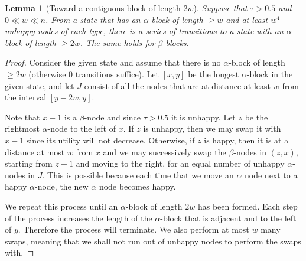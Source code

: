\documentclass[11pt]{article}
\theoremstyle{plain}
\newtheorem{lem}[thm]{Lemma}
\numberwithin{equation}{subsection}
\begin{document}
\begin{lem}[Toward a contiguous block of length $2w$]\label{le:tomonbo2w}
Suppose that $\tau> 0.5$ and $0 \ll w \ll n$.  From a state that has an $\alpha$-block  of length $\geq w$
and at least $w^4$ unhappy nodes of each type, there is a series of
transitions to a state with an $\alpha$-block  of length $\geq 2w$.
The same holds for $\beta$-blocks. 
\end{lem}
\begin{proof}
Consider the given state and assume that there is no $\alpha$-block of
length $\geq 2w$ (otherwise 0 transitions suffice).
Let $[x,y]$ be the longest $\alpha$-block in the given state, and let $J$ consist
of all the nodes that are at distance at least $w$ from the interval $[y-2w,y]$. 

Note that $x-1$ is a $\beta$-node and since $\tau>0.5$ it is unhappy.
Let $z$ be the rightmost $\alpha$-node to the left of $x$. If $z$ is unhappy,
then we may swap it with $x-1$ since its utility will
not decrease. Otherwise, if $z$ is happy, then it is at a distance at most $w$ from $x$ and we may successively swap the $\beta$-nodes in
$(z, x)$, starting from $z+1$ and moving to the right, for an equal number of
unhappy $\alpha$-nodes in $J$. This is possible because each time that we
move an $\alpha$ node next to a happy $\alpha$-node, the new $\alpha$ node becomes happy.  

We repeat this process until an $\alpha$-block
of length $2w$ has been formed. Each step of the process
increases the length of the $\alpha$-block that is adjacent and to the left of $y$.
Therefore the process will terminate. We also perform at most $w$ many swaps, meaning that we shall not run out of unhappy nodes to perform the swaps with. 
\end{proof}
\end{document}
